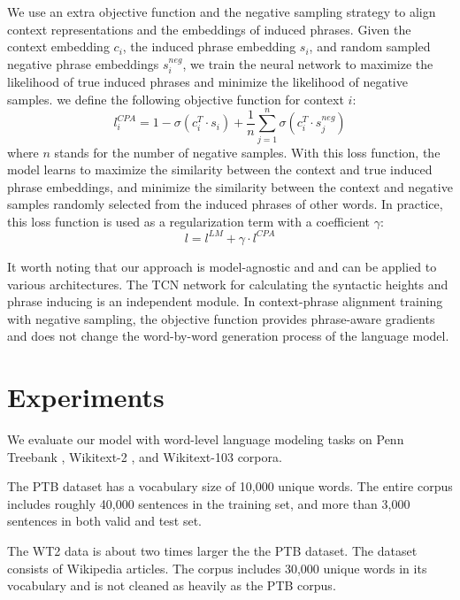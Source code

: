 \documentclass[11pt,a4paper]{article}
\begin{document}
We use an extra objective function and the negative sampling strategy to align context representations and the embeddings of induced phrases. Given the context embedding $c_i$, the induced phrase embedding $s_i$, and random sampled negative phrase embeddings $s_i^{neg}$, we train the neural network to maximize the likelihood of true induced phrases and minimize the likelihood of negative samples. we define the following objective function for context $i$:
\begin{equation}
l_i^{CPA} = 1 - \sigma(c_i^T \cdot s_i) + \frac{1}{n} \sum_{j=1}^n \sigma (c_i^T \cdot s_j^{neg})
\end{equation}
where $n$ stands for the number of negative samples. With this loss function, the model learns to maximize the similarity between the context and true induced phrase embeddings, and minimize the similarity between the context and negative samples randomly selected from the induced phrases of other words. In practice, this loss function is used as a regularization term with a coefficient $\gamma$:
\begin{equation}
l = l^{LM} + \gamma \cdot l^{CPA}
\end{equation}


It worth noting that our approach is model-agnostic and and can be applied to various architectures. The TCN network for calculating the syntactic heights and phrase inducing is an independent module. In context-phrase alignment training with negative sampling, the objective function provides phrase-aware gradients and does not change the word-by-word generation process of the language model. 

\section{Experiments}



We evaluate our model with word-level language modeling tasks on Penn Treebank  \cite[PTB;][]{mikolov2010recurrent}, Wikitext-2  \cite[WT2;][]{bradbury2016quasi}, and Wikitext-103  \cite[WT103;][]{merity2016pointer} corpora.

The PTB dataset has a vocabulary size of 10,000 unique words. The entire corpus includes roughly 40,000 sentences in the training set, and more than 3,000 sentences in both valid and test set.

The WT2 data is about two times larger the the PTB dataset. The dataset consists of Wikipedia articles. The corpus includes 30,000 unique words in its vocabulary and is not cleaned as heavily as the PTB corpus.
\end{document}
